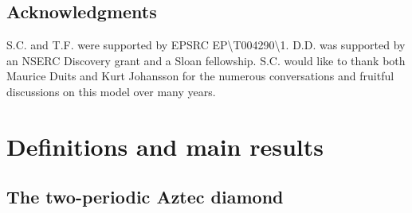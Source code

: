 \documentclass[11pt,twoside]{amsart}
\theoremstyle{plain}
\numberwithin{quest}{section}
\theoremstyle{remark}
\numberwithin{rem}{section}
\theoremstyle{definition}
\begin{document}
    
	
	
	\subsection*{Acknowledgments}
	S.C. and T.F. were supported by EPSRC EP\textbackslash T004290\textbackslash 1. D.D. was supported by an NSERC Discovery grant and a Sloan fellowship.
S.C. would like to thank both Maurice Duits and Kurt Johansson for the numerous conversations and fruitful discussions on this model over many years. 
	
	\section{Definitions and main results}
    \label{S:def-main-results}
	
	\subsection{The two-periodic Aztec diamond} \label{S:Two-periodicAztecdiamond}
	
\end{document}
